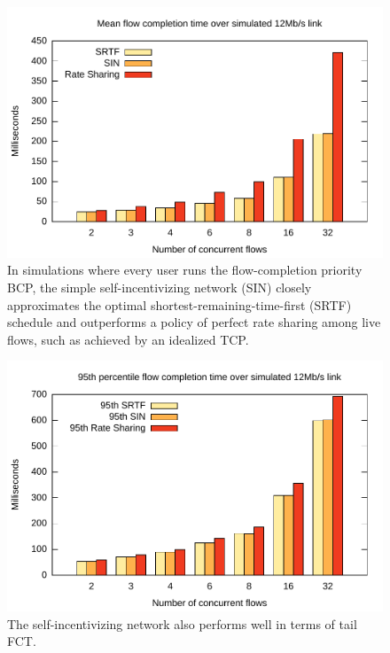 \begin{figure}
\includegraphics[width=\columnwidth]{plots/delay_over_srtf.pdf}
\caption{In simulations where every user runs the flow-completion priority BCP,
the simple self-incentivizing network (SIN) closely approximates the
optimal shortest-remaining-time-first (SRTF) schedule and outperforms
a policy of perfect rate sharing among live flows, such as achieved by
an idealized TCP.}
\label{f:delay_over_srtf}
\end{figure}

\begin{figure}
\includegraphics[width=\columnwidth]{plots/95th_delay_over_srtf.pdf}
\caption{The self-incentivizing network also performs well in terms of tail FCT.}
\label{f:95th_delay_over_srtf}
\end{figure}

